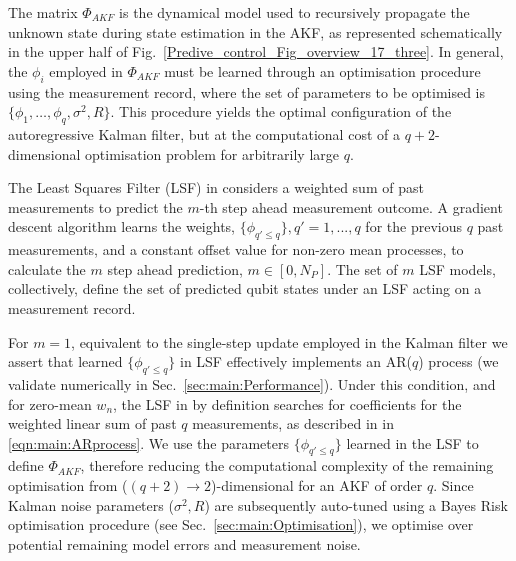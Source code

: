 \documentclass[pra, reprint]{revtex4-1}
\begin{document}
The matrix $\Phi_{AKF}$ is the dynamical model used to recursively propagate the unknown state during state estimation in the AKF, as represented schematically in the upper half of Fig.~\ref{Predive_control_Fig_overview_17_three}. In general, the ${\phi_i}$ employed in $\Phi_{AKF}$ must be learned through an optimisation procedure using the measurement record, where the set of parameters to be optimised is $\{\phi_1, \hdots, \phi_q, \sigma^2, R \}$. This procedure yields the optimal configuration of the autoregressive Kalman filter, but at the computational cost of a $q+2$-dimensional optimisation problem for arbitrarily large $q$.

The Least Squares Filter (LSF) in \cite{mavadia2017} considers a weighted sum of past measurements to predict the $m$-th step ahead measurement outcome. A gradient descent algorithm learns the weights, $\{\phi_{q' \leq q}\}, q' = 1, ... , q $ for the previous $q$ past measurements, and a constant offset value for non-zero mean processes, to calculate the $m$ step ahead prediction, $m \in [0, N_P]$. The set of $m$ LSF models, collectively, define the set of predicted qubit states under an LSF acting on a measurement record.

For $m=1$, equivalent to the single-step update employed in the Kalman filter we assert that learned $\{\phi_{q' \leq q}\}$ in LSF effectively implements an AR($q$) process (we validate numerically in Sec.~\ref{sec:main:Performance}). Under this condition, and for zero-mean $w_n$, the LSF in \cite{mavadia2017} by definition searches for coefficients for the weighted linear sum of past $q$ measurements, as described in in \cref{eqn:main:ARprocess}. We use the parameters $\{\phi_{q' \leq q}\}$ learned in the LSF to define $\Phi_{AKF}$, therefore reducing the computational complexity of the remaining optimisation from ($(q+2)\to 2$)-dimensional for an AKF of order $q$. Since Kalman noise parameters ($\sigma^2, R$) are subsequently auto-tuned using a Bayes Risk optimisation procedure (see Sec.~\ref{sec:main:Optimisation}), we optimise over potential remaining model errors and measurement noise.
\end{document}
